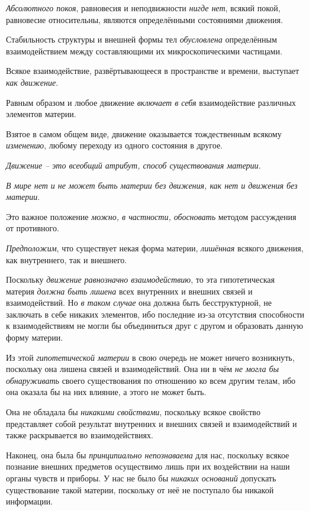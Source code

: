 \documentclass[a4paper,14pt,russian]{extreport}
\begin{document}
\emph{Абсолютного покоя}, равновесия и неподвижности \emph{нигде нет}, всякий покой, равновесие относительны, являются определёнными состояниями движения.

Стабильность структуры и внешней формы тел \emph{обусловлена} определённым взаимодействием между составляющими их микроскопическими частицами.

Всякое взаимодействие, развёртывающееся в пространстве и времени, выступает \emph{как движение}.

Равным образом и любое движение \emph{включает в себя} взаимодействие различных элементов материи.

Взятое в самом общем виде, движение оказывается тождественным всякому \emph{изменению}, любому переходу из одного состояния в другое.

\emph{Движение -- это всеобщий атрибут, способ существования материи.}

\emph{В мире нет и не может быть материи без движения, как нет и движения без материи}.

Это важное положение \emph{можно, в частности, обосновать} методом рассуждения от противного.

\emph{Предположим}, что существует некая форма материи, \emph{лишённая} всякого движения, как внутреннего, так и внешнего.

Поскольку \emph{движение равнозначно взаимодействию}, то эта гипотетическая материя \emph{должна быть лишена} всех внутренних и внешних связей и взаимодействий. Но \emph{в таком случае} она должна быть бесструктурной, не заключать в себе никаких элементов, ибо последние из-за отсутствия способности к взаимодействиям не могли бы объединиться друг с другом и образовать данную форму материи.

Из этой \emph{гипотетической материи} в свою очередь не может ничего возникнуть, поскольку она лишена связей и взаимодействий. Она ни в чём \emph{не могла бы обнаруживать} своего существования по отношению ко всем другим телам, ибо она оказала бы на них влияние, а этого не может быть.

Она не обладала бы \emph{никакими свойствами}, поскольку всякое свойство представляет собой результат внутренних и внешних связей и взаимодействий и также раскрывается во взаимодействиях.

Наконец, она была бы \emph{принципиально непознаваема} для нас, поскольку всякое познание внешних предметов осуществимо лишь при их воздействии на наши органы чувств и приборы. У нас не было бы \emph{никаких оснований} допускать существование такой материи, поскольку от неё не поступало бы никакой информации.
\end{document}
